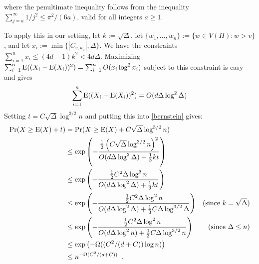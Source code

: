 \documentclass{patmorin}
\begin{document}
where the penultimate inequality follows from the inequality $\sum_{j=a}^{\infty} 1/j^2 \le \pi^2/(6a)$, valid for all integers $a\ge 1$.

To apply this in our setting, let $k:=\sqrt{\Delta}$, let $\{w_1,\ldots,w_n\}:=\{w\in V(H):w>v\}$, and let $x_i:=\min\{|C_{v,w_i}|,\Delta\}$.  We have the constraints $\sum_{i=1}^n x_i \le (4d-1)k^2 < 4d\Delta$.  Maximizing $\sum_{i=1}^n\mathrm{E}((X_i-\mathrm{E}(X_i))^2)=\sum_{i=1}^n O(x_i\log^2 x_i)$ subject to this constraint is easy and gives
\[
  \sum_{i=1}^n\mathrm{E}((X_i-\mathrm{E}(X_i))^2) = O(d\Delta\log^2 \Delta)
\]
Setting $t=C\sqrt{\Delta}\log^{3/2} n$ and putting this into \cref{bernstein} gives:
\begin{align*}
  \Pr(X\ge \mathrm{E}(X)+t)
  & = \Pr(X\ge \mathrm{E}(X)+C\sqrt{\Delta}\log^{3/2} n) \\
  & \le \exp \left(-\frac{\tfrac{1}{2}\left(C\sqrt{\Delta}\log^{3/2} n\right)^2}{O(d\Delta\log^2\Delta) + \tfrac{1}{3}kt}\right) \\
  & \le \exp \left(-\frac{\tfrac{1}{2}C^2\Delta\log^3 n}{O(d\Delta\log^2\Delta) + \tfrac{1}{3}kt}\right) \\
  & \le \exp \left(-\frac{\tfrac{1}{2}C^2\Delta\log^2 n}{O(d\Delta\log^2\Delta) + \tfrac{1}{3}C\Delta\log^{3/2}\Delta}\right) & \text{(since $k=\sqrt{\Delta}$)} \\
  & \le \exp \left(-\frac{\tfrac{1}{2}C^2\Delta\log^2 n}{O(d\Delta\log^2n) + \tfrac{1}{3}C\Delta\log^{3/2}n}\right)
  & \text{(since $\Delta \le n$)} \\
  & \le \exp \left(-\Omega((C^2/(d+C))\log n)\right) \\
  & \le n^{-\Omega(C^2/(d+C))} \enspace .
\end{align*}
\end{document}
